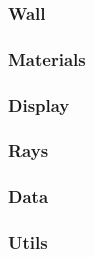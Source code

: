 \documentclass[sn-mathphys-num]{sn-jnl}
\begin{document}
\subsubsection{Wall}



\subsubsection{Materials}



\subsubsection{Display}



\subsubsection{Rays}



\subsubsection{Data}
\label{sub:data}



\subsubsection{Utils}


\end{document}
